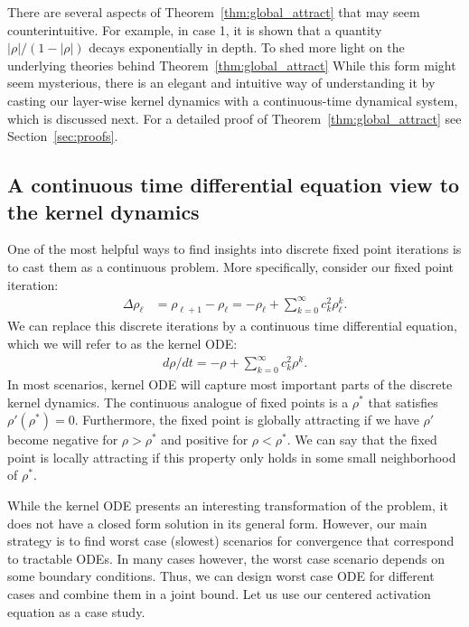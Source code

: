 \documentclass[twoside]{article}
\theoremstyle{definition}
\begin{document}
There are several aspects of Theorem~\ref{thm:global_attract} that may seem counterintuitive. For example, in case 1, it is shown that a quantity $|\rho|/(1-|\rho|)$ decays exponentially in depth. To shed more light on the underlying theories behind Theorem~\ref{thm:global_attract} 
While this form might seem mysterious, there is an elegant and intuitive way of understanding it by casting our layer-wise kernel dynamics with a continuous-time dynamical system, which is discussed next. For a detailed proof of Theorem~\ref{thm:global_attract} see Section~\ref{sec:proofs}.

\subsection{A continuous time differential equation view to the kernel dynamics} 
One of the most helpful ways to find insights into discrete fixed point iterations is to cast them as a continuous problem. More specifically, consider our fixed point iteration: 
\begin{align*}
    \Delta \rho_\ell &= \rho_{\ell+1} - \rho_\ell = - \rho_\ell + \sum_{k=0}^\infty c_k^2 \rho^k_\ell.
\end{align*}
We can replace this discrete iterations by a continuous time differential equation, which we will refer to as the kernel ODE:
\begin{align}\tag{kernel ODE}\label{eq:kernel_ODE}
    d\rho/dt = -\rho + \sum_{k=0}^\infty c_k^2 \rho^k.
\end{align}
In most scenarios, kernel ODE will capture most important parts of the discrete kernel dynamics.  The continuous analogue of fixed points is a $\rho^*$ that satisfies $\rho'(\rho^*) = 0.$ Furthermore, the fixed point is globally attracting if we have $\rho'$ become negative for $\rho>\rho^*$ and positive for $\rho<\rho^*.$ We can say that the fixed point is locally attracting if this property only holds in some small neighborhood of $\rho^*.$

While the kernel ODE presents an interesting transformation of the problem, it does not have a closed form solution in its general form. However, our main strategy is to find worst case (slowest) scenarios for convergence that correspond to tractable ODEs. In many cases however, the worst case scenario depends on some boundary conditions. Thus, we can design worst case ODE for different cases and combine them in a joint bound. Let us use our centered activation equation as a case study. 
\end{document}

